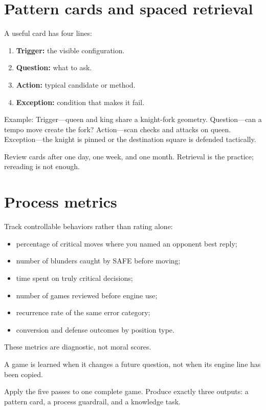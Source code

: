 \section{Pattern cards and spaced retrieval}
A useful card has four lines:

\begin{enumerate}[leftmargin=1.4em]
\item \textbf{Trigger:} the visible configuration.
\item \textbf{Question:} what to ask.
\item \textbf{Action:} typical candidate or method.
\item \textbf{Exception:} condition that makes it fail.
\end{enumerate}

Example: Trigger---queen and king share a knight-fork geometry. Question---can a tempo move create the fork? Action---scan checks and attacks on queen. Exception---the knight is pinned or the destination square is defended tactically.

Review cards after one day, one week, and one month. Retrieval is the practice; rereading is not enough.

\section{Process metrics}
Track controllable behaviors rather than rating alone:

\begin{itemize}[leftmargin=1.4em]
\item percentage of critical moves where you named an opponent best reply;
\item number of blunders caught by SAFE before moving;
\item time spent on truly critical decisions;
\item number of games reviewed before engine use;
\item recurrence rate of the same error category;
\item conversion and defense outcomes by position type.
\end{itemize}

These metrics are diagnostic, not moral scores.

\begin{memorybox}
A game is learned when it changes a future question, not when its engine line has been copied.
\end{memorybox}

\begin{exercise}
Apply the five passes to one complete game. Produce exactly three outputs: a pattern card, a process guardrail, and a knowledge task.
\end{exercise}

